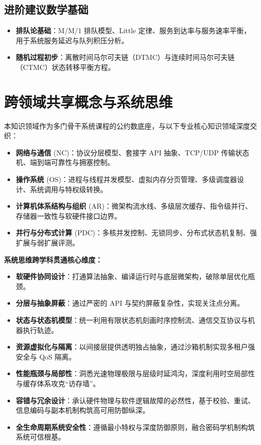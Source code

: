 \subsection{进阶建议数学基础}
\begin{itemize}
    \item \textbf{排队论基础}：M/M/1 排队模型、Little 定律、服务到达率与服务速率平衡，用于系统服务延迟与队列积压分析。
    \item \textbf{随机过程初步}：离散时间马尔可夫链（DTMC）与连续时间马尔可夫链（CTMC）状态转移平衡方程。
\end{itemize}

\section{跨领域共享概念与系统思维}

本知识领域作为多门骨干系统课程的公约数底座，与以下专业核心知识领域深度交织：
\begin{itemize}
    \item \textbf{网络与通信} (NC)：协议分层模型、套接字 API 抽象、TCP/UDP 传输状态机、端到端可靠性与拥塞控制。
    \item \textbf{操作系统} (OS)：进程与线程并发模型、虚拟内存分页管理、多级调度器设计、系统调用与特权级转换。
    \item \textbf{计算机体系结构与组织} (AR)：微架构流水线、多级层次缓存、指令级并行、存储器一致性与软硬件接口边界。
    \item \textbf{并行与分布式计算} (PDC)：多核并发控制、无锁同步、分布式状态机复制、强扩展与弱扩展评测。
\end{itemize}

\textbf{系统思维跨学科贯通核心维度：}
\begin{itemize}
    \item \textbf{软硬件协同设计}：打通算法抽象、编译运行时与底层微架构，破除单层优化瓶颈。
    \item \textbf{分层与抽象屏蔽}：通过严密的 API 与契约屏蔽复杂性，实现关注点分离。
    \item \textbf{状态与状态机模型}：统一利用有限状态机刻画时序控制流、通信交互协议与机器执行轨迹。
    \item \textbf{资源虚拟化与隔离}：以间接层提供透明独占抽象，通过沙箱机制实现多租户强安全与 QoS 隔离。
    \item \textbf{性能瓶颈与局部性}：洞悉光速物理极限与层级时延鸿沟，深度利用时空局部性与缓存体系攻克“访存墙”。
    \item \textbf{容错与冗余设计}：承认硬件物理与软件逻辑故障的必然性，基于校验、重试、信息编码与副本机制构筑高可用防御纵深。
    \item \textbf{全生命周期系统安全性}：遵循最小特权与深度防御原则，融合密码学机制构筑系统可信根基。
\end{itemize}

